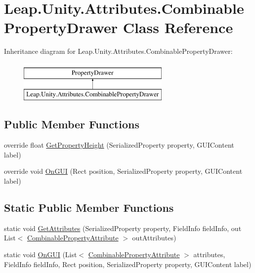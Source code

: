 \hypertarget{class_leap_1_1_unity_1_1_attributes_1_1_combinable_property_drawer}{}\section{Leap.\+Unity.\+Attributes.\+Combinable\+Property\+Drawer Class Reference}
\label{class_leap_1_1_unity_1_1_attributes_1_1_combinable_property_drawer}
Inheritance diagram for Leap.\+Unity.\+Attributes.\+Combinable\+Property\+Drawer\+:\begin{figure}[H]
\begin{center}
\leavevmode
\includegraphics[height=2.000000cm]{class_leap_1_1_unity_1_1_attributes_1_1_combinable_property_drawer}
\end{center}
\end{figure}
\subsection*{Public Member Functions}
\begin{DoxyCompactItemize}
\item 
override float \mbox{\hyperlink{class_leap_1_1_unity_1_1_attributes_1_1_combinable_property_drawer_a87a909f9fd179e71752acfe6dda5762a}{Get\+Property\+Height}} (Serialized\+Property property, G\+U\+I\+Content label)
\item 
override void \mbox{\hyperlink{class_leap_1_1_unity_1_1_attributes_1_1_combinable_property_drawer_a8e71381312b2d09a68daa42fa49e7653}{On\+G\+UI}} (Rect position, Serialized\+Property property, G\+U\+I\+Content label)
\end{DoxyCompactItemize}
\subsection*{Static Public Member Functions}
\begin{DoxyCompactItemize}
\item 
static void \mbox{\hyperlink{class_leap_1_1_unity_1_1_attributes_1_1_combinable_property_drawer_a05a2ce86dd3ec24fa832f44ecb7970a8}{Get\+Attributes}} (Serialized\+Property property, Field\+Info field\+Info, out List$<$ \mbox{\hyperlink{class_leap_1_1_unity_1_1_attributes_1_1_combinable_property_attribute}{Combinable\+Property\+Attribute}} $>$ out\+Attributes)
\item 
static void \mbox{\hyperlink{class_leap_1_1_unity_1_1_attributes_1_1_combinable_property_drawer_aa6d7097d50d005bc1f34562335bee772}{On\+G\+UI}} (List$<$ \mbox{\hyperlink{class_leap_1_1_unity_1_1_attributes_1_1_combinable_property_attribute}{Combinable\+Property\+Attribute}} $>$ attributes, Field\+Info field\+Info, Rect position, Serialized\+Property property, G\+U\+I\+Content label)
\end{DoxyCompactItemize}


